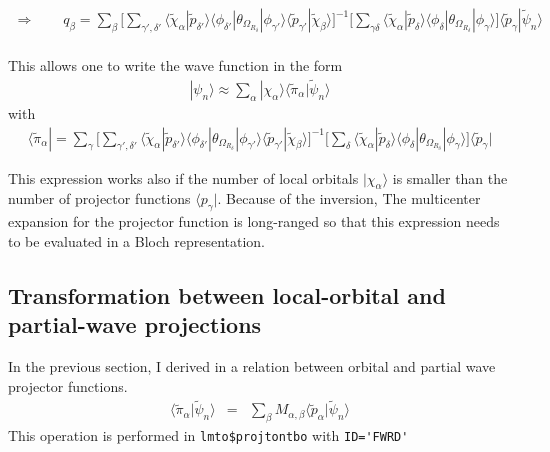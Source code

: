\documentclass[11pt,a4paper]{report}
\begin{document}
\begin{eqnarray}
\Rightarrow\qquad
q_\beta=
\sum_{\beta}
\biggl[
\sum_{\gamma',\delta'}
\langle\tilde{\chi}_\alpha|\tilde{p}_{\delta'}\rangle
\langle\phi_{\delta'}|\theta_{\Omega_{R_\delta}}|\phi_{\gamma'}\rangle
\langle\tilde{p}_{\gamma'}|\tilde{\chi}_\beta\rangle 
\biggr]^{-1}
\biggl[
\sum_{\gamma\delta}
\langle\tilde{\chi}_\alpha|\tilde{p}_\delta\rangle
\langle\phi_\delta|\theta_{\Omega_{R_\delta}}|\phi_\gamma\rangle
\biggr]
\langle\tilde{p}_\gamma|\tilde{\psi}_n\rangle
\nonumber\\
\end{eqnarray}


This allows one to write the wave function in the form
\begin{eqnarray}
|\psi_n\rangle\approx
\sum_\alpha|\chi_\alpha\rangle\langle\tilde{\pi}_\alpha|\tilde{\psi}_n\rangle
\end{eqnarray}
with
\begin{eqnarray}
\langle\tilde{\pi}_\alpha|=
\sum_\gamma \biggl[
\sum_{\gamma',\delta'}
\langle\tilde{\chi}_\alpha|\tilde{p}_{\delta'}\rangle
\langle\phi_{\delta'}|\theta_{\Omega_{R_\delta}}|\phi_{\gamma'}\rangle
\langle\tilde{p}_{\gamma'}|\tilde{\chi}_\beta\rangle 
\biggr]^{-1}
\biggl[
\sum_{\delta}
\langle\tilde{\chi}_\alpha|\tilde{p}_\delta\rangle
\langle\phi_\delta|\theta_{\Omega_{R_\delta}}|\phi_\gamma\rangle
\biggr]
\langle\tilde{p}_\gamma|
\label{eq:pitilde}
\end{eqnarray}

This expression works also if the number of local orbitals
$|\chi_\alpha\rangle$ is smaller than the number of projector
functions $\langle{p}_\gamma|$. Because of the inversion, The
multicenter expansion for the projector function is long-ranged so
that this expression needs to be evaluated in a Bloch representation.

\subsection{Transformation between local-orbital and partial-wave projections}
In the previous section, I derived in  a relation
between orbital and partial wave projector functions.
\begin{eqnarray}
\langle\tilde{\pi}_\alpha|\tilde{\psi}_n\rangle
&=&\sum_\beta M_{\alpha,\beta}\langle\tilde{p}_\alpha|\tilde{\psi}_n\rangle
\end{eqnarray}
This operation is performed in \verb|lmto$projtontbo| with \verb|ID='FWRD'|
\end{document}
